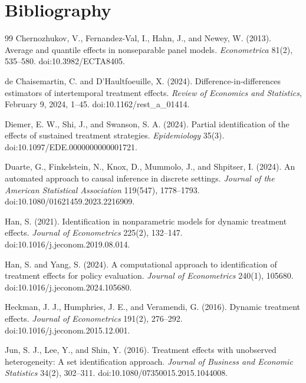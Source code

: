 \documentclass[11pt]{article}
\theoremstyle{definition}
\theoremstyle{plain}
\theoremstyle{remark}
\begin{document}
\section*{Bibliography}
\begin{thebibliography}{99}
Chernozhukov, V., Fernandez-Val, I., Hahn, J., and Newey, W. (2013).
\newblock Average and quantile effects in nonseparable panel models.
\newblock \emph{Econometrica} 81(2), 535--580.
\newblock doi:10.3982/ECTA8405.

de Chaisemartin, C. and D'Haultfoeuille, X. (2024).
\newblock Difference-in-differences estimators of intertemporal treatment effects.
\newblock \emph{Review of Economics and Statistics}, February 9, 2024, 1--45.
\newblock doi:10.1162/rest\_a\_01414.

Diemer, E. W., Shi, J., and Swanson, S. A. (2024).
\newblock Partial identification of the effects of sustained treatment strategies.
\newblock \emph{Epidemiology} 35(3).
\newblock doi:10.1097/EDE.0000000000001721.

Duarte, G., Finkelstein, N., Knox, D., Mummolo, J., and Shpitser, I. (2024).
\newblock An automated approach to causal inference in discrete settings.
\newblock \emph{Journal of the American Statistical Association} 119(547), 1778--1793.
\newblock doi:10.1080/01621459.2023.2216909.

Han, S. (2021).
\newblock Identification in nonparametric models for dynamic treatment effects.
\newblock \emph{Journal of Econometrics} 225(2), 132--147.
\newblock doi:10.1016/j.jeconom.2019.08.014.

Han, S. and Yang, S. (2024).
\newblock A computational approach to identification of treatment effects for policy evaluation.
\newblock \emph{Journal of Econometrics} 240(1), 105680.
\newblock doi:10.1016/j.jeconom.2024.105680.

Heckman, J. J., Humphries, J. E., and Veramendi, G. (2016).
\newblock Dynamic treatment effects.
\newblock \emph{Journal of Econometrics} 191(2), 276--292.
\newblock doi:10.1016/j.jeconom.2015.12.001.

Jun, S. J., Lee, Y., and Shin, Y. (2016).
\newblock Treatment effects with unobserved heterogeneity: A set identification approach.
\newblock \emph{Journal of Business and Economic Statistics} 34(2), 302--311.
\newblock doi:10.1080/07350015.2015.1044008.


\end{thebibliography}
\end{document}
